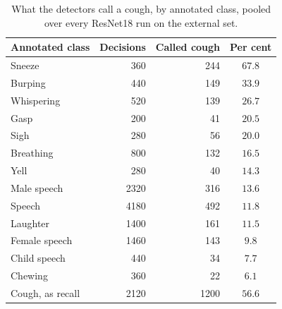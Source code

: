 \begin{table}[htbp]
\caption{What the detectors call a cough, by annotated class, pooled over every ResNet18 run on the external set.}\label{tab:confusion}
\small
\begin{tabular}{@{}lrrc@{}}
\toprule
Annotated class & Decisions & Called cough & Per cent \\
\midrule
Sneeze & 360 & 244 & $67.8$ \\
Burping & 440 & 149 & $33.9$ \\
Whispering & 520 & 139 & $26.7$ \\
Gasp & 200 & 41 & $20.5$ \\
Sigh & 280 & 56 & $20.0$ \\
Breathing & 800 & 132 & $16.5$ \\
Yell & 280 & 40 & $14.3$ \\
Male speech & 2320 & 316 & $13.6$ \\
Speech & 4180 & 492 & $11.8$ \\
Laughter & 1400 & 161 & $11.5$ \\
Female speech & 1460 & 143 & $9.8$ \\
Child speech & 440 & 34 & $7.7$ \\
Chewing & 360 & 22 & $6.1$ \\
\addlinespace
Cough, as recall & 2120 & 1200 & $56.6$ \\
\bottomrule
\end{tabular}
\end{table}

